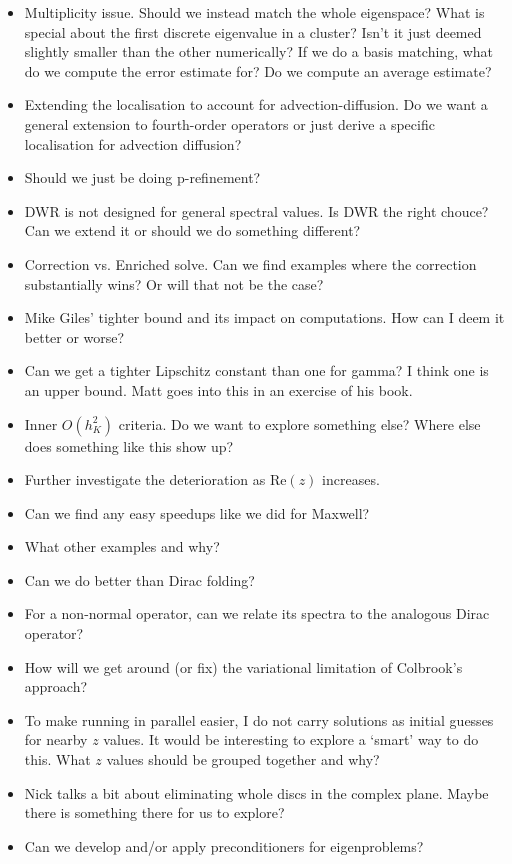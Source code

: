 \documentclass[12pt,a4paper]{article}
\begin{document}
\begin{itemize}
    \item Multiplicity issue. Should we instead match the whole eigenspace? What is special about the first discrete eigenvalue in a cluster? Isn't it just deemed slightly smaller than the other numerically? If we do a basis matching, what do we compute the error estimate for? Do we compute an average estimate? 
    \item Extending the localisation to account for advection-diffusion. Do we want a general extension to fourth-order operators or just derive a specific localisation for advection diffusion?
    \item Should we just be doing p-refinement? 
    \item DWR is not designed for general spectral values. Is DWR the right chouce? Can we extend it or should we do something different?
    \item Correction vs. Enriched solve. Can we find examples where the correction substantially wins? Or will that not be the case?
    \item Mike Giles' tighter bound and its impact on computations. How can I deem it better or worse? 
    \item Can we get a tighter Lipschitz constant than one for gamma? I think one is an upper bound. Matt goes into this in an exercise of his book. 
    \item Inner $O(h_K^2)$ criteria. Do we want to explore something else? Where else does something like this show up? 
    \item Further investigate the deterioration as $\text{Re}(z)$ increases. 
    \item Can we find any easy speedups like we did for Maxwell? 
    \item What other examples and why? 
    \item Can we do better than Dirac folding?
    \item For a non-normal operator, can we relate its spectra to the analogous Dirac operator? 
    \item How will we get around (or fix) the variational limitation of Colbrook's approach? 
    \item To make running in parallel easier, I do not carry solutions as initial guesses for nearby $z$ values. It would be interesting to explore a `smart' way to do this. What $z$ values should be grouped together and why? 
    \item Nick talks a bit about eliminating whole discs in the complex plane. Maybe there is something there for us to explore? 
    \item Can we develop and/or apply preconditioners for eigenproblems? 
\end{itemize}
\end{document}
